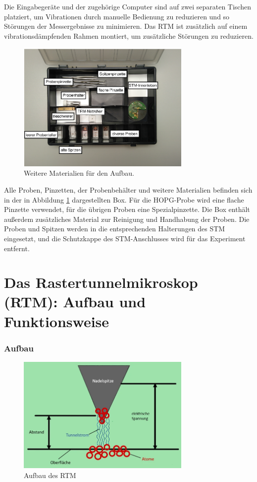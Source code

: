 Die Eingabegeräte und der zugehörige Computer sind auf zwei separaten Tischen platziert, um Vibrationen durch manuelle Bedienung zu reduzieren und so Störungen der Messergebnisse zu minimieren. Das RTM ist zusätzlich auf einem vibrationsdämpfenden Rahmen montiert, um zusätzliche Störungen zu reduzieren.
\begin{figure}
    \centering
    \includegraphics[width=0.75\textwidth]{figs/Versuch_box}
    \caption{Weitere Materialien für den Aufbau. \cite{praktikum}}
    \label{fig:Versuch box}
\end{figure}
 Alle Proben, Pinzetten, der Probenbehälter und weitere Materialien befinden sich in der in Abbildung \ref{fig:Versuch box} dargestellten Box. Für die HOPG-Probe wird eine flache Pinzette verwendet, für die übrigen Proben eine Spezialpinzette. Die Box enthält außerdem zusätzliches Material zur Reinigung und Handhabung der Proben. Die Proben und Spitzen werden in die entsprechenden Halterungen des STM eingesetzt, und die Schutzkappe des STM-Anschlusses wird für das Experiment entfernt.

\section{Das Rastertunnelmikroskop (RTM): Aufbau und Funktionsweise}

\subsubsection{Aufbau}

\begin{figure}[H]
\centering
\includegraphics[width=0.75\textwidth]{figs/RTM}
\caption{Aufbau des RTM \cite{RTM}}
\label{fig:RTM}
\end{figure}

